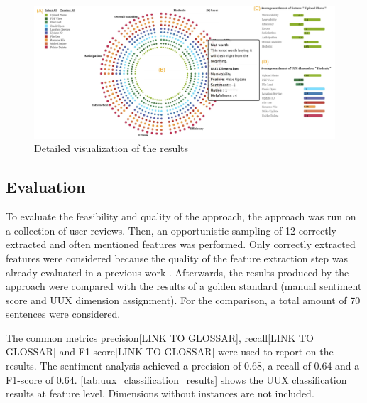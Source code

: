 \begin{figure}
    \centering
    \includegraphics[width=\textwidth]{images/Thema4_Approach1_Visualization_Detailed.png}
    \caption{Detailed visualization of the results \cite[Figure 3]{Bakiu2017}}
    \label{fig:approach1_visualization_detailed}
\end{figure}

\subsection{Evaluation}
To evaluate the feasibility and quality of the approach, the approach was run on a collection of user reviews. Then, an opportunistic sampling of 12 correctly extracted and often mentioned features was performed. Only correctly extracted features were considered because the quality of the feature extraction step was already evaluated in a previous work \cite{Guzman2014}. Afterwards, the results produced by the approach were compared with the results of a golden standard (manual sentiment score and UUX dimension assignment). For the comparison, a total amount of 70 sentences were considered.

The common metrics precision[LINK TO GLOSSAR], recall[LINK TO GLOSSAR] and F1-score[LINK TO GLOSSAR] were used to report on the results. The sentiment analysis achieved a precision of 0.68, a recall of 0.64 and a F1-score of 0.64. \autoref{tab:uux_classification_results} shows the UUX classification results at feature level. Dimensions without instances are not included.

